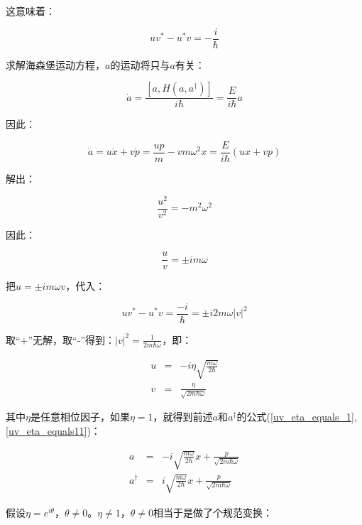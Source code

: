 这意味着：

\begin{equation}
u v^* - u^* v = - \frac{i }{\hbar}
\end{equation}

求解海森堡运动方程，$a$的运动将只与$a$有关：

\begin{equation}
\dot a = \frac{[a, H(a, a^\dagger)]}{i \hbar} = \frac{E}{i \hbar} a
\end{equation}

因此：

\begin{equation*}
\dot{a} =u \dot{x} + v \dot{p}=\frac{up}{m} - vm\omega^2x = \frac{E}{i \hbar}
(ux + vp)
\end{equation*}

解出：

\begin{equation*}
\frac{u^2}{v^2} = -m^2\omega^2
\end{equation*}

因此：

\begin{equation}
\frac{u}{v}=\pm im \omega
\end{equation}

把$u=\pm im\omega v$，代入：

\begin{equation*}
uv^* - u^*v = \frac{-i}{\hbar} = \pm i 2 m \omega |v|^2
\end{equation*}

取``+''无解，取``-''得到：$|v|^2=\frac{1}{2m\hbar\omega}$，即：

\begin{eqnarray}
u &=& -i \eta \sqrt{\frac{m \omega}{2\hbar}} \\
v &=& \frac{\eta}{\sqrt{2m\hbar \omega}}
\end{eqnarray}

其中$\eta$是任意相位因子，如果$\eta =1$，就得到前述$a$和$a^\dagger$的公式(\ref{uv_eta_equals_1}, \ref{uv_eta_equals11})：

\begin{eqnarray*}
a & = & -i \sqrt{ \frac{m \omega}{2 \hbar} } x + \frac{p}{ \sqrt{2m \hbar \omega} }\\
a^\dagger & = & i \sqrt{\frac{m \omega}{2 \hbar} } x + \frac{p}{\sqrt{2m \hbar \omega}}
\end{eqnarray*}

假设$\eta = e^{i \theta} $，$\theta \neq 0$。$\eta \neq 1$，$\theta \neq 0$相当于是做了个规范变换：

